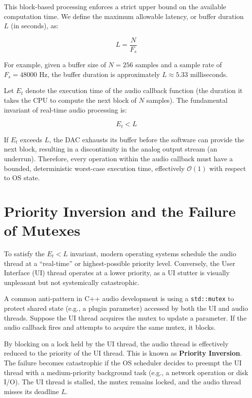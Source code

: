 \documentclass[11pt,a4paper]{article}
\begin{document}
This block-based processing enforces a strict upper bound on the available computation time. We define the maximum allowable latency, or buffer duration $L$ (in seconds), as:

\begin{equation}
L = \frac{N}{F_s}
\end{equation}

For example, given a buffer size of $N = 256$ samples and a sample rate of $F_s = 48000$ Hz, the buffer duration is approximately $L \approx 5.33$ milliseconds. 

Let $E_t$ denote the execution time of the audio callback function (the duration it takes the CPU to compute the next block of $N$ samples). The fundamental invariant of real-time audio processing is:

\begin{equation}
E_t < L
\end{equation}

If $E_t$ exceeds $L$, the DAC exhausts its buffer before the software can provide the next block, resulting in a discontinuity in the analog output stream (an underrun). Therefore, every operation within the audio callback must have a bounded, deterministic worst-case execution time, effectively $\mathcal{O}(1)$ with respect to OS state. 

\section{Priority Inversion and the Failure of Mutexes}
To satisfy the $E_t < L$ invariant, modern operating systems schedule the audio thread at a ``real-time'' or highest-possible priority level. Conversely, the User Interface (UI) thread operates at a lower priority, as a UI stutter is visually unpleasant but not systemically catastrophic.

A common anti-pattern in C++ audio development is using a \texttt{std::mutex} to protect shared state (e.g., a plugin parameter) accessed by both the UI and audio threads. Suppose the UI thread acquires the mutex to update a parameter. If the audio callback fires and attempts to acquire the same mutex, it blocks. 

By blocking on a lock held by the UI thread, the audio thread is effectively reduced to the priority of the UI thread. This is known as \textbf{Priority Inversion}. The failure becomes catastrophic if the OS scheduler decides to preempt the UI thread with a medium-priority background task (e.g., a network operation or disk I/O). The UI thread is stalled, the mutex remains locked, and the audio thread misses its deadline $L$.
\end{document}
